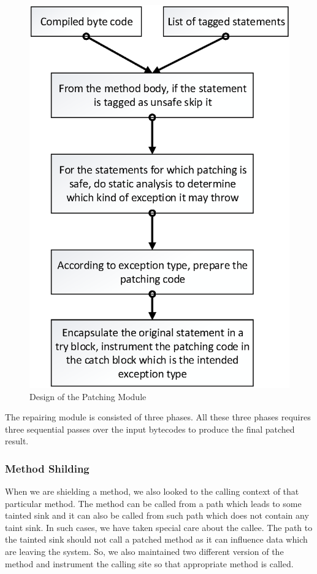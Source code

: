 \begin{figure}[t]
\centering
  \includegraphics[scale= .5]{images/PatchModule.png}
  \caption{Design of the Patching Module}
  \label{fig:PatchModule}
\end{figure}

The repairing module is consisted of three phases. All these three phases
requires three sequential passes over the input bytecodes to produce the final
patched result.


\subsubsection{Method Shilding}
\label{MethodShilding}


When we are shielding a method, we also looked to the calling context of that
particular method. The method can be called from a path which leads to some
tainted sink and it can also be called from such path which does not contain
any taint sink. In such cases, we have taken special care about the callee. The
path to the tainted sink should not call a patched method as it can influence
data which are leaving the system. So, we also maintained two different version
of
the method and instrument the calling site so that appropriate method is called.

